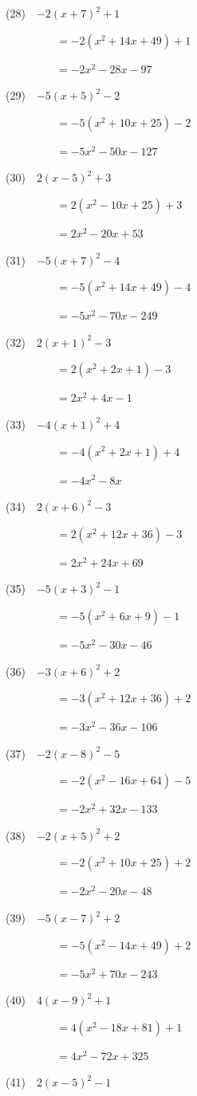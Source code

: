 \documentclass[a4j,twocolumn,10pt,fleqn]{jarticle}
\begin{document}
(28)~~$-2(x +7)^2 +1$

~~~~~~~~~$=-2(x^2 +14x +49) +1$

~~~~~~~~~$=-2x^2-28x-97$

(29)~~$-5(x +5)^2-2$

~~~~~~~~~$=-5(x^2 +10x +25)-2$

~~~~~~~~~$=-5x^2-50x-127$

(30)~~$2(x-5)^2 +3$

~~~~~~~~~$=2(x^2-10x +25) +3$

~~~~~~~~~$=2x^2-20x +53$

(31)~~$-5(x +7)^2-4$

~~~~~~~~~$=-5(x^2 +14x +49)-4$

~~~~~~~~~$=-5x^2-70x-249$

(32)~~$2(x +1)^2-3$

~~~~~~~~~$=2(x^2 +2x +1)-3$

~~~~~~~~~$=2x^2 +4x-1$

(33)~~$-4(x +1)^2 +4$

~~~~~~~~~$=-4(x^2 +2x +1) +4$

~~~~~~~~~$=-4x^2-8x$

(34)~~$2(x +6)^2-3$

~~~~~~~~~$=2(x^2 +12x +36)-3$

~~~~~~~~~$=2x^2 +24x +69$

(35)~~$-5(x +3)^2-1$

~~~~~~~~~$=-5(x^2 +6x +9)-1$

~~~~~~~~~$=-5x^2-30x-46$

(36)~~$-3(x +6)^2 +2$

~~~~~~~~~$=-3(x^2 +12x +36) +2$

~~~~~~~~~$=-3x^2-36x-106$

(37)~~$-2(x-8)^2-5$

~~~~~~~~~$=-2(x^2-16x +64)-5$

~~~~~~~~~$=-2x^2 +32x-133$

(38)~~$-2(x +5)^2 +2$

~~~~~~~~~$=-2(x^2 +10x +25) +2$

~~~~~~~~~$=-2x^2-20x-48$

(39)~~$-5(x-7)^2 +2$

~~~~~~~~~$=-5(x^2-14x +49) +2$

~~~~~~~~~$=-5x^2 +70x-243$

(40)~~$4(x-9)^2 +1$

~~~~~~~~~$=4(x^2-18x +81) +1$

~~~~~~~~~$=4x^2-72x +325$

(41)~~$2(x-5)^2-1$
\end{document}
